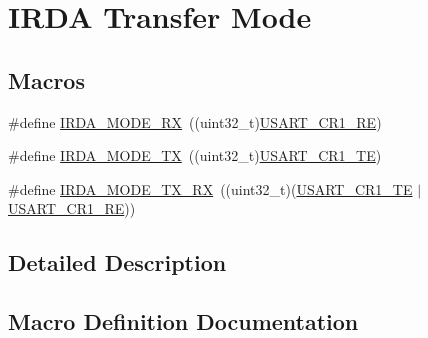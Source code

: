 \hypertarget{group___i_r_d_a___transfer___mode}{}\section{I\+R\+DA Transfer Mode}
\label{group___i_r_d_a___transfer___mode}
\subsection*{Macros}
\begin{DoxyCompactItemize}
\item 
\#define \hyperlink{group___i_r_d_a___transfer___mode_ga510410f9b2126127f5f1a7e86b49427a}{I\+R\+D\+A\+\_\+\+M\+O\+D\+E\+\_\+\+RX}~((uint32\+\_\+t)\hyperlink{group___peripheral___registers___bits___definition_gada0d5d407a22264de847bc1b40a17aeb}{U\+S\+A\+R\+T\+\_\+\+C\+R1\+\_\+\+RE})
\item 
\#define \hyperlink{group___i_r_d_a___transfer___mode_ga9f26f67fa86746fab0039fe60a1ccefd}{I\+R\+D\+A\+\_\+\+M\+O\+D\+E\+\_\+\+TX}~((uint32\+\_\+t)\hyperlink{group___peripheral___registers___bits___definition_gade7f090b04fd78b755b43357ecaa9622}{U\+S\+A\+R\+T\+\_\+\+C\+R1\+\_\+\+TE})
\item 
\#define \hyperlink{group___i_r_d_a___transfer___mode_gada775794a25b76b7ecafc9bea3fc1f8a}{I\+R\+D\+A\+\_\+\+M\+O\+D\+E\+\_\+\+T\+X\+\_\+\+RX}~((uint32\+\_\+t)(\hyperlink{group___peripheral___registers___bits___definition_gade7f090b04fd78b755b43357ecaa9622}{U\+S\+A\+R\+T\+\_\+\+C\+R1\+\_\+\+TE} $\vert$\hyperlink{group___peripheral___registers___bits___definition_gada0d5d407a22264de847bc1b40a17aeb}{U\+S\+A\+R\+T\+\_\+\+C\+R1\+\_\+\+RE}))
\end{DoxyCompactItemize}


\subsection{Detailed Description}


\subsection{Macro Definition Documentation}
\mbox{\label{group___i_r_d_a___transfer___mode_ga510410f9b2126127f5f1a7e86b49427a}} 
